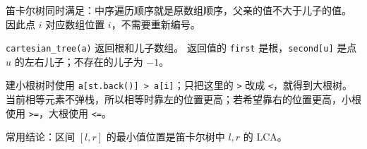 笛卡尔树同时满足：中序遍历顺序就是原数组顺序，父亲的值不大于儿子的值。
因此点 $i$ 对应数组位置 $i$，不需要重新编号。

\texttt{cartesian\_tree(a)} 返回根和儿子数组。
返回值的 \texttt{first} 是根，\texttt{second[u]} 是点 $u$ 的左右儿子；不存在的儿子为 $-1$。

建小根树时使用 \texttt{a[st.back()] > a[i]}；只把这里的 \texttt{>} 改成 \texttt{<}，就得到大根树。
当前相等元素不弹栈，所以相等时靠左的位置更高；若希望靠右的位置更高，小根使用 \texttt{>=}，大根使用 \texttt{<=}。

常用结论：区间 $[l,r]$ 的最小值位置是笛卡尔树中 $l,r$ 的 LCA。
